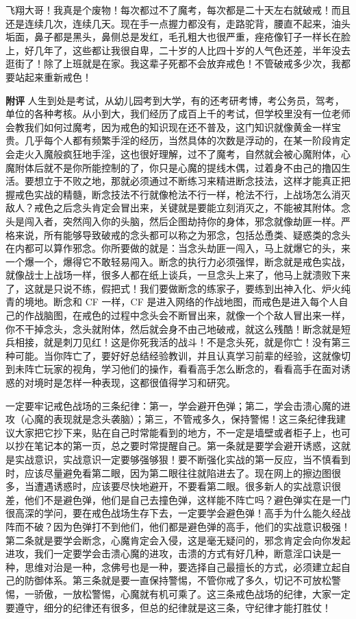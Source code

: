 \begin{case}
    飞翔大哥！我真是个废物！每次都过不了魔考，每次都是二十天左右就破戒！而且还是连续几次，连续几天。现在手一点握力都没有，走路驼背，腰直不起来，油头垢面，鼻子都是黑头，鼻侧总是发红，毛孔粗大也很严重，痤疮像钉子一样长在脸上，好几年了，这些都让我很自卑，二十岁的人比四十岁的人气色还差，半年没去逛街了！除了上班就是在家。我这辈子死都不会放弃戒色！不管破戒多少次，我都要站起来重新戒色！

    \textbf{附评} 人生到处是考试，从幼儿园考到大学，有的还考研考博，考公务员，驾考，单位的各种考核。从小到大，我们经历了成百上千的考试，但学校里没有一位老师会教我们如何过魔考，因为戒色的知识现在还不普及，这门知识就像黄金一样宝贵。几乎每个人都有频繁手淫的经历，当然具体的次数是浮动的，在某一阶段肯定会走火入魔般疯狂地手淫，这也很好理解，过不了魔考，自然就会被心魔附体，心魔附体后就不是你所能控制的了，你只是心魔的提线木偶，过着身不由己的撸囚生活。要想立于不败之地，那就必须通过不断练习来精进断念技法，这样才能真正把握戒色实战的精髓，断念技法不行就像枪法不行一样，枪法不行，上战场怎么消灭敌人？戒色之后念头肯定会冒出来，关键就是要能立刻消灭之，不能被其附体。念头是闯入者，突然闯入你的头脑，然后企图劫持你的身体，邪念就像劫匪一样。严格来说，所有能够导致破戒的念头都可以称之为邪念，包括怂恿类、疑惑类的念头在内都可以算作邪念。你所要做的就是：当念头劫匪一闯入，马上就爆它的头，来一个爆一个，爆得它不敢轻易闯入。断念的执行力必须强悍，断念就是戒色实战，就像战士上战场一样，很多人都在纸上谈兵，一旦念头上来了，他马上就溃败下来了，这就是只说不练，假把式！我们要做断念的练家子，要练到出神入化、炉火纯青的境地。断念和 CF 一样，CF 是进入网络的作战地图，而戒色是进入每个人自己的作战脑图，在戒色的过程中念头会不断冒出来，就像一个个敌人冒出来一样，你不干掉念头，念头就附体，然后就会身不由己地破戒，就这么残酷！断念就是短兵相接，就是刺刀见红！这是你死我活的战斗！不是念头死，就是你亡！没有第三种可能。当你阵亡了，要好好总结经验教训，并且认真学习前辈的经验，这就像切到未阵亡玩家的视角，学习他们的操作，看看高手怎么断念的，看看高手在面对诱惑的对境时是怎样一种表现，这都很值得学习和研究。

    一定要牢记戒色战场的三条纪律：第一，学会避开色弹；第二，学会击溃心魔的进攻（心魔的表现就是念头袭脑）；第三，不管戒多久，保持警惕！这三条纪律我建议大家把它抄下来，贴在自己时常能看到的地方，不一定是墙壁或者柜子上，也可以抄在笔记本的第一页，总之要时常提醒自己。第一条就是要学会避开诱惑，这就是实战意识，实战意识一定要够强够狠！要不断强化实战的第一反应，当不慎看到时，应该尽量避免看第二眼，因为第二眼往往就陷进去了。现在网上的擦边图很多，当遭遇诱惑时，应该要尽快地避开，不要看第二眼。很多新人的实战意识很差，他们不是避色弹，他们是自己去撞色弹，这样能不阵亡吗？避色弹实在是一门很高深的学问，要在戒色战场生存下去，一定要学会避色弹！高手为什么能久经战阵而不破？因为色弹打不到他们，他们都是避色弹的高手，他们的实战意识极强！第二条就是要学会断念，心魔肯定会入侵，这是毫无疑问的，邪念肯定会向你发起进攻，我们一定要学会击溃心魔的进攻，击溃的方式有好几种，断意淫口诀是一种，思维对治是一种，念佛号也是一种，要选择自己最擅长的方式，必须建立起自己的防御体系。第三条就是要一直保持警惕，不管你戒了多久，切记不可放松警惕，一骄傲，一放松警惕，心魔就有机可乘了。这三条戒色战场的纪律，大家一定要遵守，细分的纪律还有很多，但总的纪律就是这三条，守纪律才能打胜仗！


\end{case}
